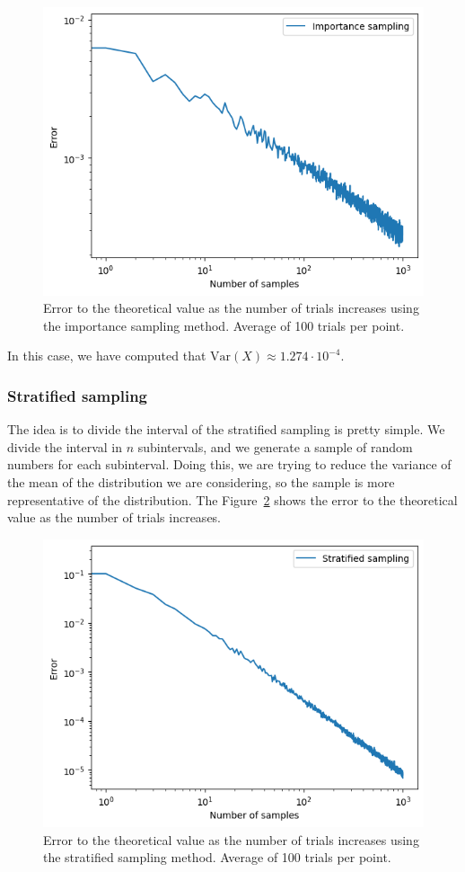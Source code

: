 \documentclass{article}
\begin{document}
\begin{figure}[H]
	\centering
	\includegraphics[width=0.5\linewidth]{./Figures/VarianceReduction/importance.png}
	\caption{Error to the theoretical value as the number of trials increases using the importance sampling method. Average of 100 trials per point.}
	\label{fig:importancesampling}
\end{figure}

In this case, we have computed that \(\mathrm{Var}(X) \approx 1.274 \cdot 10^{-4}\).

\subsubsection{Stratified sampling}
\label{sec:stratified_sampling}

The idea is to divide the interval of the stratified sampling is pretty simple. We divide the interval in \(n\) subintervals, and we generate a sample of random numbers for each subinterval. Doing this, we are trying to reduce the variance of the mean of the distribution we are considering, so the sample is more representative of the distribution. The Figure~\ref{fig:stratifiedsampling} shows the error to the theoretical value as the number of trials increases.

\begin{figure}[H]
	\centering
	\includegraphics[width=0.5\linewidth]{./Figures/VarianceReduction/stratified.png}
	\caption{Error to the theoretical value as the number of trials increases using the stratified sampling method. Average of 100 trials per point.}
	\label{fig:stratifiedsampling}
\end{figure}
\end{document}
